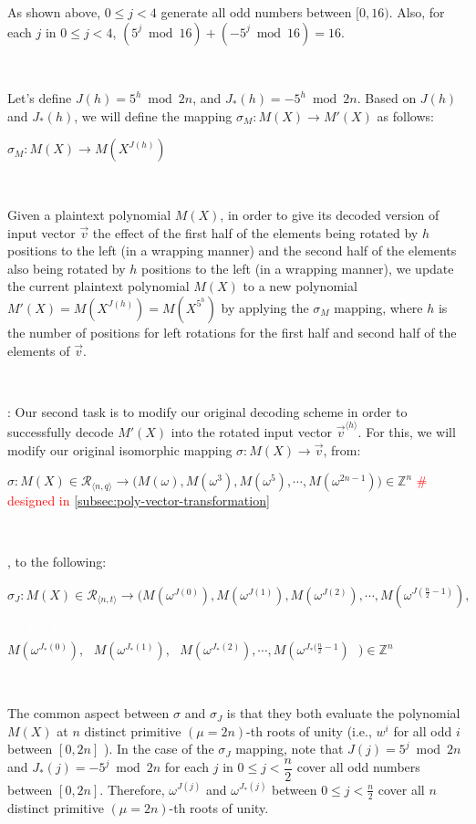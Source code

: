 As shown above, $0 \leq j < 4$ generate all odd numbers between $[0, 16)$. Also, for each $j$ in $0 \leq j < 4$, $(5^j \bmod 16) + (-5^j \bmod 16) = 16$. 

$ $

Let's define $J(h) = 5^h \bmod 2n$, \text{ } and \text{ } $J_*(h) = -5^h \bmod 2n$. Based on $J(h)$ and $J_*(h)$, we will define the mapping $\sigma_M : M(X) \rightarrow M'(X)$ as follows:

$\sigma_{M} : M(X) \rightarrow M(X^{J(h)})$

$ $

Given a plaintext polynomial $M(X)$, in order to give its decoded version of input vector $\vec{v}$ the effect of the first half of the elements being rotated by $h$ positions to the left (in a wrapping manner) and the second half of the elements also being rotated by $h$ positions to the left (in a wrapping manner), we update the current plaintext polynomial $M(X)$ to a new polynomial $M'(X) = M(X^{J(h)}) = M(X^{5^h})$ by applying the $\sigma_M$ mapping, where $h$ is the number of positions for left rotations for the first half and second half of the elements of $\vec{v}$. 


$ $

: Our second task is to modify our original decoding scheme in order to successfully decode $M'(X)$ into the rotated input vector $\vec{v}^{\langle h \rangle}$. For this, we will modify our original isomorphic mapping $\sigma : M(X) \longrightarrow \vec{v}$, from:

$\sigma: M(X) \in \mathcal{R}_{\langle n, q \rangle} \longrightarrow  \bm{(}M(\omega), M(\omega^3),M(\omega^5), \cdots, M(\omega^{2n-1})\bm{)} \in \mathbb{Z}^n$ \textcolor{red}{ \text{ } \# designed in \autoref{subsec:poly-vector-transformation}}

$ $

, to the following: 

$\sigma_J: M(X) \in \mathcal{R}_{\langle n, t \rangle} \longrightarrow  \bm{(}M(\omega^{J(0)}),M(\omega^{J(1)}),M(\omega^{J(2)}), \cdots, M(\omega^{J(\frac{n}{2} - 1)}), $

\textcolor{white}{$\sigma_J: M(X) \in \mathcal{R}_{\langle n, q \rangle} \longrightarrow  \bm{(}$} $M(\omega^{J_*(0)}), \text{ } M(\omega^{J_*(1)}), \text{ } M(\omega^{J_*(2)}), \cdots, M(\omega^{J_*(\frac{n}{2} - 1}) \text{ } \bm{)} \in \mathbb{Z}^{n}$


$ $

The common aspect between $\sigma$ and $\sigma_J$ is that they both evaluate the polynomial $M(X)$ at $n$ distinct primitive $(\mu=2n)$-th roots of unity (i.e., $w^i$ for all odd $i$ between $[0,2n]$ ). In the case of the $\sigma_J$ mapping, note that $J(j) = 5^j \bmod 2n$ \text{ } and \text{ } $J_*(j) = -5^j \bmod 2n$ \text{ } for each $j$ in $0 \leq j < \dfrac{n}{2} $ \text{ }  cover all odd numbers between $[0, 2n]$. Therefore, $\omega^{J(j)}$ and $\omega^{J_*(j)}$ between $0 \leq j < \frac{n}{2}$ cover all $n$ distinct primitive $(\mu=2n)$-th roots of unity.

